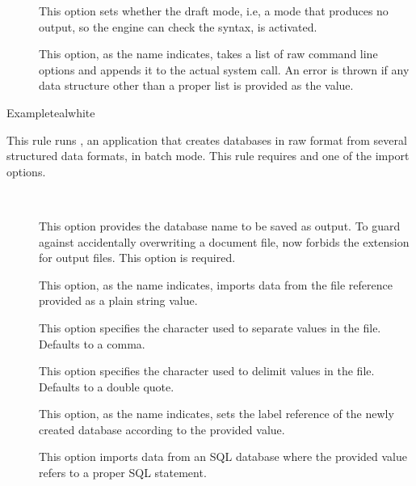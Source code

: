 \begin{description}
\begin{description}
\item[] This option sets whether the draft mode, i.e, a mode that produces no output, so the engine can check the syntax, is activated.

\item[] This option, as the name indicates, takes a list of raw command line options and appends it to the actual system call. An error is thrown if any data structure other than a proper list is provided as the value.
\end{description}

\begin{codebox}{Example}{teal}{\icnote}{white}
\end{codebox}

\item[\rulebox{datatooltk}]
This rule runs , an application that creates  databases in raw format from several structured data formats, in batch mode. This rule requires  and one of the import options.

\begin{description}
\item[~\rqbox] This option provides the database name to be saved as output. To guard against accidentally overwriting a document file,  now forbids the  extension for output files. This option is required.

\item[] This option, as the name indicates, imports data from the  file reference provided as a plain string value.

\item[] This option specifies the character used to separate values in the  file. Defaults to a comma.

\item[] This option specifies the character used to delimit values in the  file. Defaults to a double quote.

\item[] This option, as the name indicates, sets the label reference of the newly created database according to the provided value.

\item[] This option imports data from an SQL database where the provided value refers to a proper  SQL statement.


\end{description}
\end{description}
